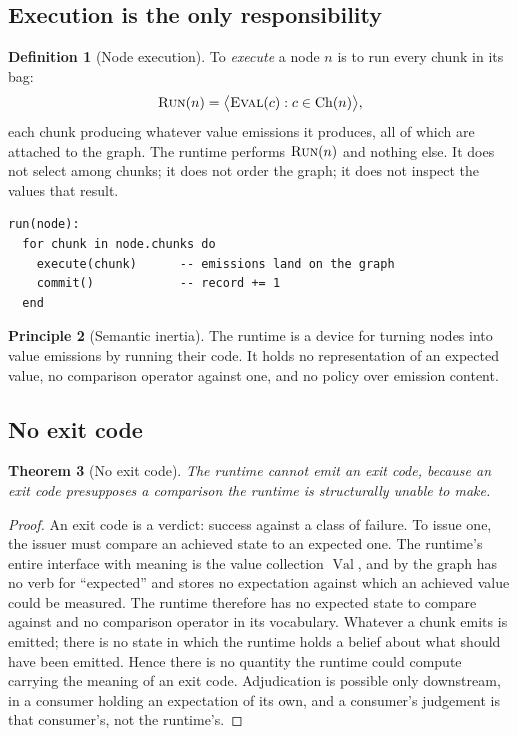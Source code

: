 \documentclass[11pt,twocolumn,a4paper]{article}
\newtheorem{theorem}{Theorem}[section]
\theoremstyle{definition}
\newtheorem{definition}[theorem]{Definition}
\newtheorem{principle}[theorem]{Principle}
\theoremstyle{remark}
\newcommand{\Chunks}{\operatorname{Ch}}
\newcommand{\Vals}{\operatorname{Val}}
\newcommand{\node}{n}
\newcommand{\dispatch}{\textsc{Run}}
\begin{document}
\subsection{Execution is the only responsibility}

\begin{definition}[Node execution]
\label{def:exec}
To \emph{execute} a node $\node$ is to run every chunk in its bag:
\[
\dispatch(\node)=\bigl\langle \textsc{Eval}(c) : c\in\Chunks(\node)\bigr\rangle,
\]
each chunk producing whatever value emissions it produces, all of which are
attached to the graph. The runtime performs $\dispatch(\node)$ and nothing else.
It does not select among chunks; it does not order the graph; it does not inspect
the values that result.
\end{definition}

\begin{lstlisting}[caption={The kernel's entire semantic content.},label={lst:kernel}]
run(node):
  for chunk in node.chunks do
    execute(chunk)      -- emissions land on the graph
    commit()            -- record += 1
  end
\end{lstlisting}

\begin{principle}[Semantic inertia]
\label{prin:inert}
The runtime is a device for turning nodes into value emissions by running their
code. It holds no representation of an expected value, no comparison operator
against one, and no policy over emission content.
\end{principle}

\subsection{No exit code}

\begin{theorem}[No exit code]
\label{thm:no-exit}
The runtime cannot emit an exit code, because an exit code presupposes a
comparison the runtime is structurally unable to make.
\end{theorem}

\begin{proof}
An exit code is a verdict: success against a class of failure. To issue one, the
issuer must compare an achieved state to an expected one. The runtime's entire
interface with meaning is the value collection $\Vals$, and by 
the graph has no verb for ``expected'' and stores no expectation against which an
achieved value could be measured. The runtime therefore has no expected state to
compare against and no comparison operator in its vocabulary. Whatever a chunk
emits is emitted; there is no state in which the runtime holds a belief about
what should have been emitted. Hence there is no quantity the runtime could
compute carrying the meaning of an exit code. Adjudication is possible only
downstream, in a consumer holding an expectation of its own, and a consumer's
judgement is that consumer's, not the runtime's.
\end{proof}
\end{document}
